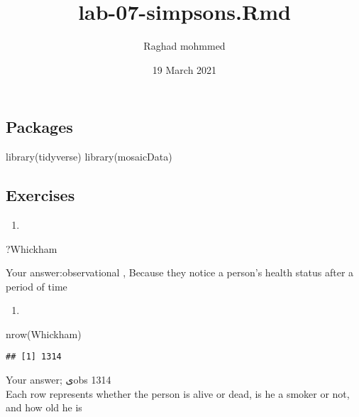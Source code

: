 \documentclass[
]{article}
\title{lab-07-simpsons.Rmd}
\author{Raghad mohmmed}
\date{19 March 2021}
\newenvironment{Shaded}{\begin{snugshade}}{\end{snugshade}}
\newcommand{\FunctionTok}[1]{\textcolor[rgb]{0.00,0.00,0.00}{#1}}
\newcommand{\NormalTok}[1]{#1}
\providecommand{\tightlist}{%
  \setlength{\itemsep}{0pt}\setlength{\parskip}{0pt}}
\begin{document}
\maketitle

\hypertarget{packages}{%
\subsection{Packages}\label{packages}}

\begin{Shaded}
\begin{Highlighting}[]
\FunctionTok{library}\NormalTok{(tidyverse) }
\FunctionTok{library}\NormalTok{(mosaicData)}
\end{Highlighting}
\end{Shaded}

\hypertarget{exercises}{%
\subsection{Exercises}\label{exercises}}

\begin{enumerate}
\def\labelenumi{\arabic{enumi}.}
\tightlist
\item
\end{enumerate}

\begin{Shaded}
\begin{Highlighting}[]
\NormalTok{?Whickham}
\end{Highlighting}
\end{Shaded}

Your answer:observational , Because they notice a person's health status
after a period of time

\begin{enumerate}
\def\labelenumi{\arabic{enumi}.}
\setcounter{enumi}{1}
\tightlist
\item
\end{enumerate}

\begin{Shaded}
\begin{Highlighting}[]
\FunctionTok{nrow}\NormalTok{(Whickham)}
\end{Highlighting}
\end{Shaded}

\begin{verbatim}
## [1] 1314
\end{verbatim}

Your answer; ىobs 1314\\
Each row represents whether the person is alive or dead, is he a smoker
or not, and how old he is
\end{document}
